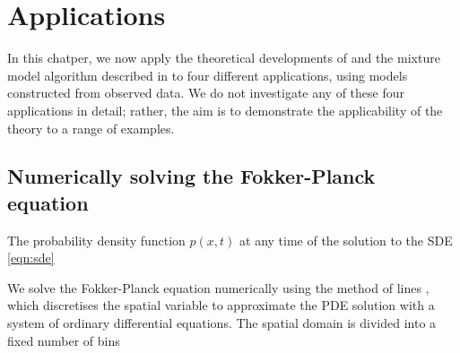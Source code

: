 \chapter{Applications}\label{ch:appls}



In this chatper, we now apply the theoretical developments of  and the mixture model algorithm described in  to four different applications, using models constructed from observed data.
We do not investigate any of these four applications in detail; rather, the aim is to demonstrate the applicability of the theory to a range of examples.



\section{Numerically solving the Fokker-Planck equation}

The probability density function \(p\!\left(x,t\right)\) at any time of the solution to the SDE \cref{eqn:sde}



We solve the Fokker-Planck equation numerically using the method of lines \citep{}, which discretises the spatial variable to approximate the PDE solution with a system of ordinary differential equations.
The spatial domain is divided into a fixed number of bins


